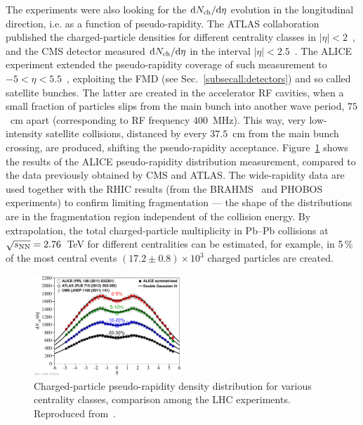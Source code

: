 The experiments were also looking for the ${\rm d}N_{\rm ch}/{\rm d}\eta$ evolution in the longitudinal direction, i.e. as a function of pseudo-rapidity. The ATLAS collaboration published the charged-particle densities for different centrality classes in $|\eta| < 2$~\cite{ATLAS:2011ag}, and the CMS detector measured ${\rm d}N_{\rm ch}/{\rm d}\eta$ in the interval $|\eta| < 2.5$~\cite{Chatrchyan:2011pb}. The ALICE experiment extended the pseudo-rapidity coverage of such measurement to $- 5 < \eta < 5.5$~\cite{Abbas:2013bpa}, exploiting the FMD (see Sec.~\ref{subsecall:detectors}) and so called satellite bunches. The latter are created in the accelerator RF cavities, when a small fraction of particles slips from the main bunch into another wave period, $75$~cm apart (corresponding to RF frequency $400$~MHz). This way, very low-intensity satellite collisions, distanced by every $37.5$~cm from the main bunch crossing, are produced, shifting the pseudo-rapidity acceptance. Figure~\ref{figks:MultEta} shows the results of the ALICE pseudo-rapidity distribution measurement, compared to the data previously obtained by CMS and ATLAS. The wide-rapidity data are used together with the RHIC results (from the BRAHMS~\cite{Bearden:2001qq} and PHOBOS~\cite{Alver:2010ck} experiments) to confirm limiting fragmentation --- the shape of the distributions are in the fragmentation region independent of the collision energy. By extrapolation, the total charged-particle multiplicity in Pb--Pb collisions at $\sqrt{s_{\rm NN}} = 2.76$~TeV for different centralities can be estimated, for example, in 5\,\% of the most central events $(17.2 \pm 0.8) \times 10^3$ charged particles are created.

\begin{figure}
\centering
\includegraphics[width=0.5\textwidth]{ksfigures/MultEtaCent.pdf}
\caption{Charged-particle pseudo-rapidity density distribution for various centrality classes, comparison among the LHC experiments. Reproduced from~\cite{Abbas:2013bpa}.}
\label{figks:MultEta}
\end{figure}


